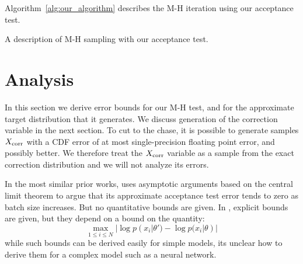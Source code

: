 \documentclass{article}
\begin{document}
Algorithm~\ref{alg:our_algorithm} describes the M-H iteration using our acceptance test.


\begin{algorithm}[t]
\caption{A description of M-H sampling with our acceptance test.}
\label{alg:our_algorithm}
\end{algorithm}

\section{Analysis}\label{sec:analysis}

In this section we derive error bounds for our M-H test, and for the approximate target
distribution that it generates. We discuss generation of the correction variable in the
next section. To cut to the chase, it is possible to generate samples $X_{\rm corr}$ with
a CDF error of at most single-precision floating point error, and possibly better. We
therefore treat the $X_{\rm corr}$ variable as a sample from the exact correction distribution
and we will not analyze its errors.

In the most similar prior works, \cite{cutting_mh_2014} uses asymptotic arguments based
on the central limit theorem to argue that its approximate acceptance test error tends to
zero as batch size increases. But no quantitative bounds are given. In
\cite{icml2014c1_bardenet14}, explicit bounds are given, but they depend on a bound on
the quantity:
\begin{equation}
  \max_{1\leq i\leq N}|\log p(x_i|\theta') - \log p(x_i|\theta)|
\end{equation}
while such bounds can be derived easily for simple models, its unclear how to derive them
for a complex model such as a neural network.
\end{document}
